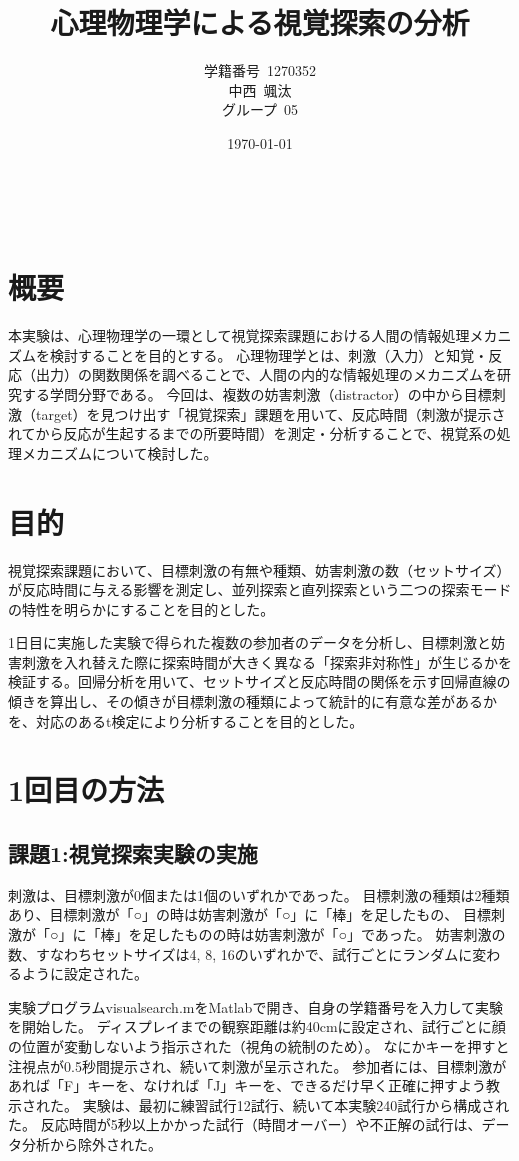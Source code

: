 \documentclass{jlreq}
\title{心理物理学による視覚探索の分析}
\author{学籍番号~1270352\\
        中西~颯汰\\
        グループ~05\\
        }
\date{\today}
\begin{document}
\maketitle
\clearpage　
\tableofcontents
\clearpage
\section{概要}
本実験は、心理物理学の一環として視覚探索課題における人間の情報処理メカニズムを検討することを目的とする。
心理物理学とは、刺激（入力）と知覚・反応（出力）の関数関係を調べることで、人間の内的な情報処理のメカニズムを研究する学問分野である。
今回は、複数の妨害刺激（distractor）の中から目標刺激（target）を見つけ出す「視覚探索」課題を用いて、反応時間（刺激が提示されてから反応が生起するまでの所要時間）を測定・分析することで、視覚系の処理メカニズムについて検討した。

\section{目的}
視覚探索課題において、目標刺激の有無や種類、妨害刺激の数（セットサイズ）が反応時間に与える影響を測定し、並列探索と直列探索という二つの探索モードの特性を明らかにすることを目的とした。

1日目に実施した実験で得られた複数の参加者のデータを分析し、目標刺激と妨害刺激を入れ替えた際に探索時間が大きく異なる「探索非対称性」が生じるかを検証する。回帰分析を用いて、セットサイズと反応時間の関係を示す回帰直線の傾きを算出し、その傾きが目標刺激の種類によって統計的に有意な差があるかを、対応のあるt検定により分析することを目的とした。
\section{1回目の方法}
\subsection{課題1:視覚探索実験の実施}
刺激は、目標刺激が0個または1個のいずれかであった。
目標刺激の種類は2種類あり、目標刺激が「○」の時は妨害刺激が「○」に「棒」を足したもの、
目標刺激が「○」に「棒」を足したものの時は妨害刺激が「○」であった。
妨害刺激の数、すなわちセットサイズは4, 8, 16のいずれかで、試行ごとにランダムに変わるように設定された。

実験プログラムvisualsearch.mをMatlabで開き、自身の学籍番号を入力して実験を開始した。
ディスプレイまでの観察距離は約40cmに設定され、試行ごとに顔の位置が変動しないよう指示された（視角の統制のため）。
なにかキーを押すと注視点が0.5秒間提示され、続いて刺激が呈示された。
参加者には、目標刺激があれば「F」キーを、なければ「J」キーを、できるだけ早く正確に押すよう教示された。
実験は、最初に練習試行12試行、続いて本実験240試行から構成された。
反応時間が5秒以上かかった試行（時間オーバー）や不正解の試行は、データ分析から除外された。
\end{document}
